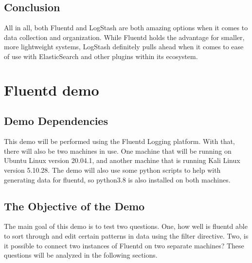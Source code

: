 \documentclass{article}
\begin{document}
\subsection{Conclusion}
\quad \quad
All in all, both Fluentd and LogStash are both amazing options when it comes to data collection and organization. While Fluentd holds the advantage for smaller, more lightweight systems, LogStash definitely pulls ahead when it comes to ease of 
use with ElasticSearch and other plugins within its ecosystem.
\section{Fluentd demo} \label{sec:demo}
\subsection{Demo Dependencies}
\quad \quad This demo will be performed using the Fluentd Logging platform. With that, there will also be two machines in use. One machine that will be running on Ubuntu Linux version 20.04.1, and another machine that is running Kali Linux version 5.10.28.
The demo will also use some python scripts to help with generating data for fluentd, so python3.8 is also installed on both machines.
\subsection{The Objective of the Demo}
\quad \quad The main goal of this demo is to test two questions. One, how well is fluentd able to sort through and edit certain patterns in data using the filter directive. Two, is it possible to connect two instances of 
Fluentd on two separate machines? These questions will be analyzed in the following sections.
\end{document}
